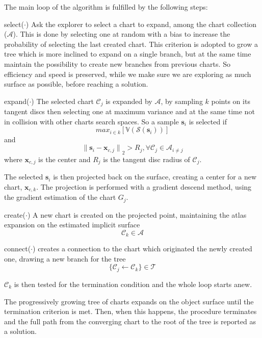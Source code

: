 The main loop of the algorithm is fulfilled by the following steps:\\
\begin{inparadesc}
\item[select($\cdot$)] Ask the explorer to select a chart to expand,
among the chart collection ($\mathcal{A}$).
This is done by selecting one at random with a bias to increase the probability
of selecting the last created chart. This criterion is adopted to grow a tree
which is more inclined to expand on a single branch, but at the same time maintain the
possibility to create new branches from previous charts. So efficiency and speed
is preserved, while we make sure we are exploring as much surface as possible,
before reaching a solution.\\
\item[expand($\cdot$)] The selected chart $\mathcal{C}_j$ is expanded by $\mathcal{A}$, by
sampling $k$ points on its tangent discs then selecting one at maximum variance
and at the same time not in collision with other charts search spaces. 
So a sample $\mathbf{s}_i$ is selected if 
$$
\mathit{max}_{i\in k}[\mathbb{V}(\mathcal{S}(\mathbf{s}_i))]
$$
and 
$$
{\parallel\mathbf{s}_i - \mathbf{x}_{c,j}\parallel}_{2} > R_j, \forall \mathcal{C}_j \in \mathcal{A}_{i \ne j}
$$
where $\mathbf{x}_{c,j}$ is the center and $R_j$ is the tangent disc radius of $\mathcal{C}_j$.

The selected $\mathbf{s}_i$ is then projected back on the surface,
creating a center for a new chart, $\mathbf{x}_{c,k}$.
The projection is performed with a gradient descend method, using the gradient estimation
of the chart $G_j$.\\
\item[create($\cdot$)] A new chart  is created on the projected point, maintaining the atlas
    expansion on the estimated implicit surface
$$
\mathcal{C}_k \in \mathcal{A}
$$
\item[connect($\cdot$)] creates a connection to the chart which originated the newly created one,
    drawing a new branch for the tree
$$
\{\mathcal{C}_j \leftarrow \mathcal{C}_k \} \in \mathcal{T}
$$
\end{inparadesc}

$\mathcal{C}_k$ is then tested for the termination condition and the whole loop
starts anew.

The progressively growing tree of charts expands on the object surface until
the termination criterion is met. Then, when this happens, the procedure terminates and the full
path from the converging chart to the root of the tree is reported as a solution.

